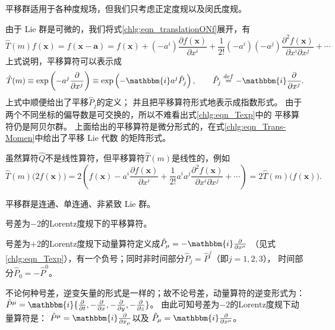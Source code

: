 平移群适用于各种度规场，但我们只考虑正定度规以及闵氏度规。

由于 Lie 群是可微的，我们将式\eqref{chlg:eqn_translationONf}展开，有
\begin{equation*}
    \hat{T}(m) f(\boldsymbol{x}) = f(\boldsymbol{x} - \boldsymbol{a}) 
    = f(\boldsymbol{x}) + (-a^i) \frac{\partial f(\boldsymbol{x})}{\partial x^i}
    +\frac{1}{2!} (-a^i)(-a^j) \frac{\partial^2 f(\boldsymbol{x})}{\partial x^i \partial x^j}
    +\cdots 
\end{equation*}
上式说明，平移算符可以表示成
\begin{equation}\label{chlg:eqn_Texp}
    \hat{T}(m) \equiv \exp\left( -a^j \frac{\partial }{\partial x^j} \right) 
    \equiv\exp\left(-\mathbbm{i} a^j \hat{P}_j  \right) , \qquad
    \hat{P}_j\overset{def}{=} -\mathbbm{i}\frac{\partial }{\partial x^j} .
\end{equation}
上式中顺便给出了平移$\hat{P}_j$的定义；
并且把平移算符形式地表示成指数形式。
由于两个不同坐标的偏导数是可交换的，所以不难看出式\eqref{chlg:eqn_Texp}中的
平移算符仍是阿贝尔群。
上面给出的平移算符是微分形式的，在式\eqref{chlg:eqn_Trans-Momen}中给出了平移 Lie 代数
的矩阵形式。

虽然算符$\hat{Q}$不是线性算符，但平移算符$\hat{T}(m)$是线性的，例如
\begin{equation*}
    \hat{T}(m) \bigl(2f(\boldsymbol{x})\bigr) 
    =2\left( f(\boldsymbol{x}) - a^i \frac{\partial f(\boldsymbol{x})}{\partial x^i}
    +\frac{1}{2!} a^i a^j \frac{\partial^2 f(\boldsymbol{x})}{\partial x^i \partial x^j}
    +\cdots \right) = 2 \hat{T}(m) \bigl(f(\boldsymbol{x})\bigr)  .
\end{equation*}

平移群是连通、单连通、非紧致 Lie 群。

\begin{example}\label{chlg:exam_pm2}
    号差为$-2$的Lorentz度规下的平移算符。
\end{example}
号差为$+2$的Lorentz度规下动量算符定义成$\hat{P}_\mu =- \mathbbm{i}\frac{\partial }{\partial x^\mu}$
（见式\eqref{chlg:eqn_Texp}），有一个负号；同时非时间部分$\hat{P}_j =\hat{P}^j$（即$j=1,2,3$），
时间部分$\hat{P}_0 =-\hat{P}^0$。

不论何种号差，逆变矢量的形式是一样的；故不论号差，动量算符的逆变形式为：
$\hat{P}^\mu=\mathbbm{i}\{\frac{\partial}{\partial t}, -\frac{\partial}{\partial x},
-\frac{\partial}{\partial y},-\frac{\partial}{\partial z}\}$。
由此可知号差为$-2$的Lorentz度规下动量算符是：
$\hat{P}^\mu = \mathbbm{i}\frac{\partial }{\partial x_\mu}$以及
$\hat{P}_\mu = \mathbbm{i}\frac{\partial }{\partial x^\mu}$。

